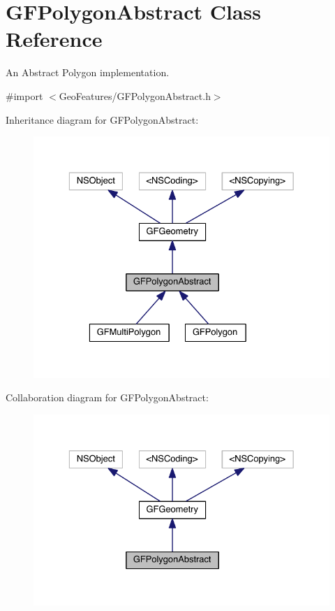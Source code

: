 \hypertarget{interface_g_f_polygon_abstract}{}\section{G\+F\+Polygon\+Abstract Class Reference}
\label{interface_g_f_polygon_abstract}


An Abstract Polygon implementation.  




{\ttfamily \#import $<$Geo\+Features/\+G\+F\+Polygon\+Abstract.\+h$>$}



Inheritance diagram for G\+F\+Polygon\+Abstract\+:\nopagebreak
\begin{figure}[H]
\begin{center}
\leavevmode
\includegraphics[width=329pt]{interface_g_f_polygon_abstract__inherit__graph}
\end{center}
\end{figure}


Collaboration diagram for G\+F\+Polygon\+Abstract\+:\nopagebreak
\begin{figure}[H]
\begin{center}
\leavevmode
\includegraphics[width=329pt]{interface_g_f_polygon_abstract__coll__graph}
\end{center}
\end{figure}
